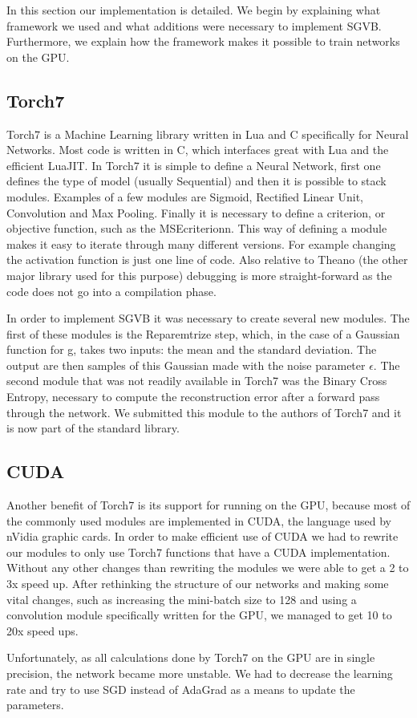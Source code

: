 In this section our implementation is detailed. We begin by explaining what framework we used and what additions were necessary to implement SGVB. Furthermore, we explain how the framework makes it possible to train networks on the GPU. 

\subsection{Torch7}

Torch7 \cite{collobert2011torch7} is a Machine Learning library written in Lua and C specifically for Neural Networks. Most code is written in C, which interfaces great with Lua and the efficient LuaJIT. In Torch7 it is simple to define a Neural Network, first one defines the type of model (usually Sequential) and then it is possible to stack modules. Examples of a few modules are Sigmoid, Rectified Linear Unit, Convolution and Max Pooling. Finally it is necessary to define a criterion, or objective function, such as the MSEcriterionn. This way of defining a module makes it easy to iterate through many different versions. For example changing the activation function is just one line of code. Also relative to Theano (the other major library used for this purpose) debugging is more straight-forward as the code does not go into a compilation phase.

In order to implement SGVB it was necessary to create several new modules. The first of these modules is the Reparemtrize step, which, in the case of a Gaussian function for g, takes two inputs: the mean and the standard deviation. The output are then samples of this Gaussian made with the noise parameter $\epsilon$. The second module that was not readily available in Torch7 was the Binary Cross Entropy, necessary to compute the reconstruction error after a forward pass through the network. We submitted this module to the authors of Torch7 and it is now part of the standard library.


\subsection{CUDA}

Another benefit of Torch7 is its support for running on the GPU, because most of the commonly used modules are implemented in CUDA, the language used by nVidia graphic cards. In order to make efficient use of CUDA we had to rewrite our modules to only use Torch7 functions that have a CUDA implementation. Without any other changes than rewriting the modules we were able to get a 2 to 3x speed up. After rethinking the structure of our networks and making some vital changes, such as increasing the mini-batch size to 128 and using a convolution module specifically written for the GPU, we managed to get 10 to 20x speed ups.

Unfortunately, as all calculations done by Torch7 on the GPU are in single precision, the network became more unstable. We had to decrease the learning rate and try to use SGD instead of AdaGrad as a means to update the parameters.


\newpage